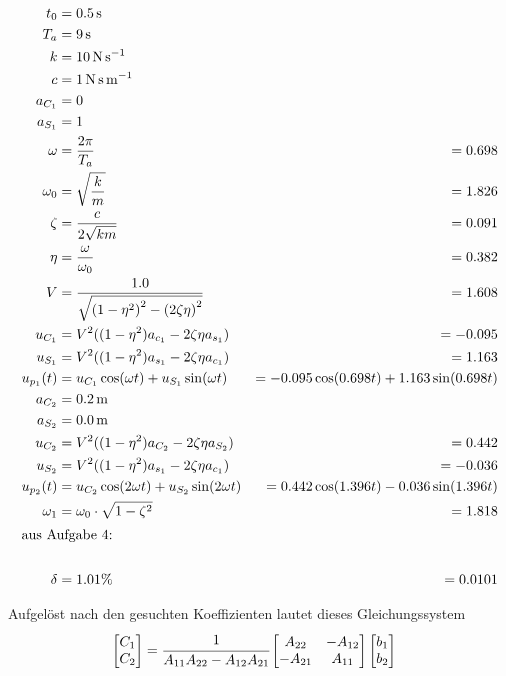 \begin{solution}
  \begin{solution}  
        \begin{align*}
            t_0 &= \SI{0.5}{\second}\\
            T_a &= \SI{9}{\second} \\
            k &=  \SI{10}{\newton \per \second} \\
            c &= \SI{1}{\newton \second \per \meter} \\
            a_{C_1} &= 0 \\
            a_{S_1} &= 1 \\
            \omega &= \frac{2 \pi}{T_a} &= 0.698 \\
            \omega_0 &= \sqrt{\frac{k}{m}} &= 1.826\\
            \zeta &= \frac{c}{2 \sqrt{km}} &= 0.091\\
            \eta &= \frac{\omega}{\omega_0} &= 0.382\\
            V &= \frac{1.0}{\sqrt{{(1-\eta^2)}^2 - {(2 \zeta \eta)}^2}} &= 1.608\\
            u_{C_1}  &= V^2 ((1-\eta^2) a_{c_1} - 2 \zeta \eta a_{s_1}) &= -0.095 \\ 
            u_{S_1} &= V^2 ((1-\eta^2) a_{s_1} - 2 \zeta \eta a_{c_1}) &= 1.163 \\  
            u_{p_1}(t) &= u_{C_1} \cos(\omega t) + u_{S_1} \sin(\omega t) &= -0.095 \cos(0.698 t) + 1.163 \sin(0.698 t)\\
            a_{C_2} &= \SI{0.2}{\meter} \\
            a_{S_2} &= \SI{0.0}{\meter} \\
            u_{C_2} &= V^2 ((1-\eta^2) a_{C_2} - 2 \zeta \eta a_{S_2}) &= 0.442\\
            u_{S_2} &= V^2 ((1-\eta^2) a_{s_1} - 2 \zeta \eta a_{c_1}) &= -0.036\\
            u_{p_2}(t) &= u_{C_2} \cos(2\omega t) + u_{S_2} \sin(2\omega t) &= 0.442 \cos(1.396t) -0.036 \sin(1.396 t) \\
            \omega_1 &= \omega_0 \cdot \sqrt{1 - \zeta^2} &= 1.818\\
            \intertext{aus Aufgabe 4:} \\
            \delta &= 1.01 \% &= 0.0101\\
        \end{align*}
    
    Aufgelöst nach den gesuchten Koeffizienten lautet dieses Gleichungssystem
    \begin{align*}
        &\begin{bmatrix}
            C_1 \\
            C_2
        \end{bmatrix}
        = \cfrac{1}{A_{11}A_{22}-A_{12}A_{21}}
        \begin{bmatrix}
            A_{22} & -A_{12}\\
            -A_{21} & A_{11}
        \end{bmatrix}
        \begin{bmatrix}
            b_1 \\
            b_2
        \end{bmatrix}


\end{align*}
\end{solution}
\end{solution}
